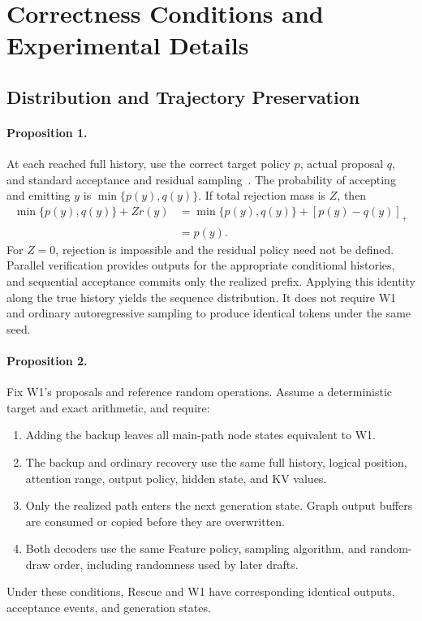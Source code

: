 \section{Correctness Conditions and Experimental Details}
\label{app:details}
\subsection{Distribution and Trajectory Preservation}
\label{app:proof}
\paragraph{Proposition 1.}
At each reached full history, use the correct target policy $p$, actual proposal $q$, and standard acceptance and residual sampling~\cite{leviathan}. The probability of accepting and emitting $y$ is $\min\{p(y),q(y)\}$. If total rejection mass is $Z$, then
\begin{align}
\min\{p(y),q(y)\}+Zr(y)
&=\min\{p(y),q(y)\}+[p(y)-q(y)]_+\nonumber\\
&=p(y).
\end{align}
For $Z=0$, rejection is impossible and the residual policy need not be defined. Parallel verification provides outputs for the appropriate conditional histories, and sequential acceptance commits only the realized prefix. Applying this identity along the true history yields the sequence distribution. It does not require W1 and ordinary autoregressive sampling to produce identical tokens under the same seed.

\paragraph{Proposition 2.}
Fix W1's proposals and reference random operations. Assume a deterministic target and exact arithmetic, and require:
\begin{enumerate}[leftmargin=*,itemsep=2pt]
\item Adding the backup leaves all main-path node states equivalent to W1.
\item The backup and ordinary recovery use the same full history, logical position, attention range, output policy, hidden state, and KV values.
\item Only the realized path enters the next generation state. Graph output buffers are consumed or copied before they are overwritten.
\item Both decoders use the same Feature policy, sampling algorithm, and random-draw order, including randomness used by later drafts.
\end{enumerate}
Under these conditions, Rescue and W1 have corresponding identical outputs, acceptance events, and generation states.

